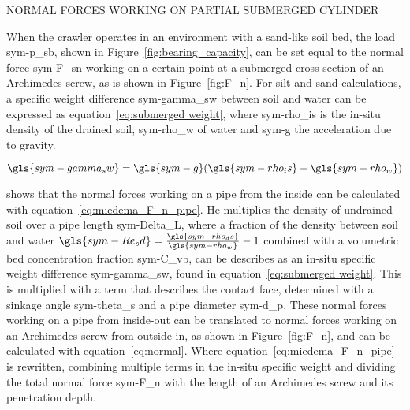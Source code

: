 \begin{RoyalFigure}[!htb, label=fig:F_n]{NORMAL FORCES WORKING ON PARTIAL SUBMERGED CYLINDER}
\end{RoyalFigure}

When the crawler operates in an environment with a sand-like soil bed, the load \gls{sym-p_sb}, shown in
Figure~\ref{fig:bearing_capacity}, can be set equal to the normal force \gls{sym-F_sn} working on a certain point at a
submerged cross section of an Archimedes screw, as is shown in Figure~\ref{fig:F_n}. For silt and sand calculations, a
specific weight difference \gls{sym-gamma_sw} between soil and water can be expressed as equation~\ref{eq:submerged
weight}, where \gls{sym-rho_is} is the in-situ density of the drained soil, \gls{sym-rho_w} of water and \gls{sym-g} the
acceleration due to gravity.

\begin{equation}
    \label{eq:submerged weight}
    \gls{sym-gamma_sw} = \gls{sym-g} (\gls{sym-rho_is} - \gls{sym-rho_w})
\end{equation}

\citet{miedema_slurry_2016} shows that the normal forces working on a pipe from the inside can be calculated with 
equation~\ref{eq:miedema_F_n_pipe}. He multiplies the density of undrained soil over a pipe length \gls{sym-Delta_L},
where a fraction of the density between soil and water \( \gls{sym-Re_sd} = \frac{\gls{sym-rho_ds}}{\gls{sym-rho_w}} 
- 1 \) combined with a volumetric bed concentration fraction \gls{sym-C_vb}, can be describes as an in-situ specific 
weight difference \gls{sym-gamma_sw}, found in equation~\ref{eq:submerged weight}. This is multiplied with a term 
that describes the contact face, determined with a sinkage angle \gls{sym-theta_s} and a pipe diameter \gls{sym-d_p}.
These normal forces working on a pipe from inside-out can be translated to normal forces working on an Archimedes 
screw from outside in, as shown in Figure~\ref{fig:F_n}, and can be calculated with equation~\ref{eq:normal}. Where 
equation~\ref{eq:miedema_F_n_pipe} is rewritten, combining multiple terms in the in-situ specific weight and dividing
the total normal force \gls{sym-F_n} with the length of an Archimedes screw and its penetration depth.

